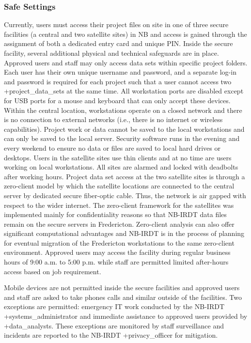\documentclass[
]{WileySix}
\begin{document}
\hypertarget{safe-settings-2}{%
\subsubsection{Safe Settings}\label{safe-settings-2}}

Currently, users must access their project files on site in one of three secure facilities (a central and two satellite sites) in NB and access is gained through the assignment of both a dedicated entry card and unique PIN. Inside the secure facility, several additional physical and technical safeguards are in place. Approved users and staff may only access data sets within specific project folders. Each user has their own unique username and password, and a separate log-in and password is required for each project such that a user cannot access two +project\_data\_sets\textbar{} at the same time. All workstation ports are disabled except for USB ports for a mouse and keyboard that can only accept these devices. Within the central location, workstations operate on a closed network and there is no connection to external networks (i.e., there is no internet or wireless capabilities). Project work or data cannot be saved to the local workstations and can only be saved to the local server. Security software runs in the evening and every weekend to ensure no data or files are saved to local hard drives or desktops. Users in the satellite sites use thin clients and at no time are users working on local workstations. All sites are alarmed and locked with deadbolts after working hours. Project data set access at the two satellite sites is through a zero-client model by which the satellite locations are connected to the central server by dedicated secure fiber-optic cable. Thus, the network is air gapped with respect to the wider internet. The zero-client framework for the satellites was implemented mainly for confidentiality reasons so that NB-IRDT data files remain on the secure servers in Fredericton. Zero-client analysis can also offer significant computational advantages and NB-IRDT is in the process of planning for eventual migration of the Fredericton workstations to the same zero-client environment. Approved users may access the facility during regular business hours of 9:00 a.m. to 5:00 p.m. while staff are permitted limited after-hours access based on job requirement.

Mobile devices are not permitted inside the secure facilities and approved users and staff are asked to take phones calls and similar outside of the facilities. Two exceptions are permitted: emergency IT work conducted by the NB-IRDT +systems\_administrator\textbar{} and immediate assistance to approved users provided by +data\_analysts\textbar. These exceptions are monitored by staff surveillance and incidents are reported to the NB-IRDT +privacy\_officer\textbar{} for mitigation.
\end{document}
